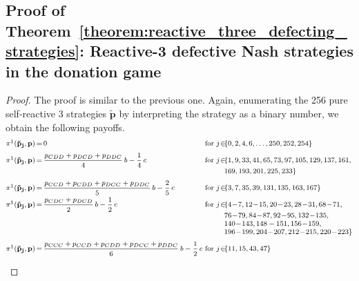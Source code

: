 \documentclass[11pt]{article}
\theoremstyle{plainCl1}
\theoremstyle{plainCl2}
\begin{document}

\subsection{Proof of Theorem~\ref{theorem:reactive_three_defecting_strategies}:
Reactive-3 defective Nash strategies in the donation game}

\begin{proof}
  The proof is similar to the previous one. 
  Again, enumerating the 256 pure self-reactive 3 strategies $\mathbf{\tilde p}$ by interpreting the strategy as a binary number, we obtain the following payoffs. 
  \begin{equation*}\label{Eq:PayoffExpressionsReactiveThree}
  \footnotesize
  \setlength{\arraycolsep}{0mm}
  \begin{array}{lclll}
  \pi^1(\mathbf{\tilde p_j},\mathbf{p}) &{\, = \,}
  &\displaystyle 0
  &~\text{for}~ j\! \in\! 
  &\{0, 2, 4, 6, \dots, 250, 252, 254\} \\[0.2cm]
  
  \pi^1(\mathbf{\tilde p_j},\mathbf{p}) &= 
  &\displaystyle \frac{p_{CDD} + p_{DCD} + p_{DDC}}{4} \,b - \frac{1}{4} \,c
  &~\text{for}~ j\! \in\!  
  & \{ 1, 9, 33, 41, 65, 73, 97, 105, 129, 137, 161,
    \\ & & &  &169, 193, 201, 225, 233\} \\[0.2cm]
      
  \pi^1(\mathbf{\tilde p_j},\mathbf{p}) &= 
  &\displaystyle \frac{p_{CCD} + p_{CDD} + p_{DCC} + p_{DDC}}{5}\, b - \frac{2}{5} \,c
  &~\text{for}~ j\! \in\!  
  & \{ 3, 7, 35, 39, 131, 135, 163, 167\} \\[0.2cm]
  
  \pi^1(\mathbf{\tilde p_j},\mathbf{p}) &= 
  &\displaystyle \frac{p_{CDC} + p_{DCD}}{2} \, b - \frac{1}{2} \, c
  &~\text{for}~ j\! \in\!  
  & \{ 4 \!- \!7, 12 \!- \!15, 20 \!- \!23, 28 \!- \!31, 68 \!- \!71,
      \\ & & &  &76 \!- \!79, 84 \!- \!87, 92 \!- \!95, 132 \!- \!135, 
      \\ & & & &140 \!- \!143, 148- 151, 156 \!- \!159, 
      \\ & & & &196 \!- \!199, 204 \!- \!207, 212 \!- \!215, 220 \!- \!223\} \\[0.2cm]
      
  \pi^1(\mathbf{\tilde p_j},\mathbf{p}) &= 
  &\displaystyle \frac{p_{CCC} + p_{CCD} + p_{CDD} + p_{DCC} + p_{DDC}}{6} \,b - \frac{1}{2} \, c
  &~\text{for}~ j\! \in\! 
  & \{ 11, 15, 43, 47\} \\ [0.2cm]
  

\end{array}
\end{equation*}
\end{proof}
\end{document}
